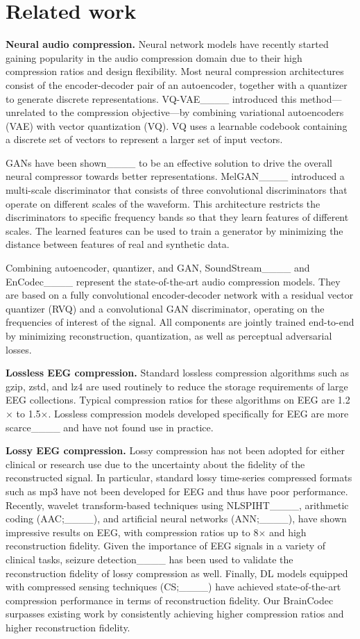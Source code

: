 \section{Related work}
\textbf{Neural audio compression.} 
Neural network models have recently started gaining popularity in the audio compression domain due to their high compression ratios and design flexibility. Most neural compression architectures consist of the encoder-decoder pair of an autoencoder, together with a quantizer to generate discrete representations. VQ-VAE____ introduced this method---unrelated to the compression objective---by combining variational autoencoders (VAE) with vector quantization (VQ). VQ uses a learnable codebook containing a discrete set of vectors to represent a larger set of input vectors.

GANs have been shown____ to be an effective solution to drive the overall neural compressor towards better representations. MelGAN____ introduced a multi-scale discriminator that consists of three convolutional discriminators that operate on different scales of the waveform. This architecture restricts the discriminators to specific frequency bands so that they learn features of different scales. The learned features can be used to train a generator by minimizing the distance between features of real and synthetic data.

Combining autoencoder, quantizer, and GAN, SoundStream____ and EnCodec____ represent the state-of-the-art audio compression models. They are based on a fully convolutional encoder-decoder network with a residual vector quantizer (RVQ) and a convolutional GAN discriminator, operating on the frequencies of interest of the signal. All components are jointly trained end-to-end by minimizing reconstruction, quantization, as well as perceptual adversarial losses. 

\textbf{Lossless EEG compression.} Standard lossless compression algorithms such as gzip, zstd, and lz4 are used routinely to reduce the storage requirements of large EEG collections. Typical compression ratios for these algorithms on EEG are 1.2$\times$ to 1.5$\times$. Lossless compression models developed specifically for EEG are more scarce____ and have not found use in practice.

\textbf{Lossy EEG compression.} Lossy compression has not been adopted for either clinical or research use due to the uncertainty about the fidelity of the reconstructed signal. In particular, standard lossy time-series compressed formats such as mp3 have not been developed for EEG and thus have poor performance. Recently, wavelet transform-based techniques using NLSPIHT____, arithmetic coding (AAC;____), and artificial neural networks (ANN;____), have shown impressive results on EEG, with compression ratios up to 8$\times$ and high reconstruction fidelity. Given the importance of EEG signals in a variety of clinical tasks, seizure detection____ has been used to validate the reconstruction fidelity of lossy compression as well. Finally, DL models equipped with compressed sensing techniques (CS;____) have achieved state-of-the-art compression performance in terms of reconstruction fidelity. Our BrainCodec surpasses existing work by consistently achieving higher compression ratios and higher reconstruction fidelity.